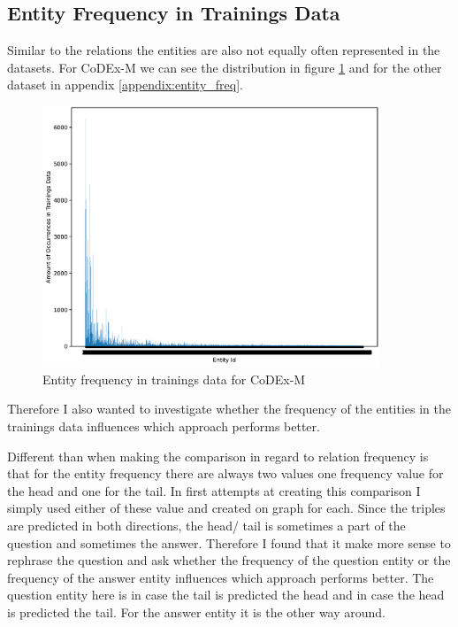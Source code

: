 \subsection{Entity Frequency in Trainings Data}
Similar to the relations the entities are also not equally often represented in the datasets. For CoDEx-M we can see the distribution in figure \ref{fig:entity_freq_codex} and for the other dataset in appendix \ref{appendix:entity_freq}. 

\begin{figure}[H]
\centering
\includegraphics[width=0.9\textwidth]{images/entity_freq_codex.PNG}
\caption{Entity frequency in trainings data for CoDEx-M}
\label{fig:entity_freq_codex}
\end{figure}

Therefore I also wanted to investigate whether the frequency of the entities in the trainings data influences which approach performs better. 

Different than when making the comparison in regard to relation frequency is that for the entity frequency there are always two values one frequency value for the head and one for the tail. In first attempts at creating this comparison I simply used either of these value and created on graph for each. Since the triples are predicted in both directions, the head/ tail is sometimes a part of the question and sometimes the answer. Therefore I found that it make more sense to rephrase the question and ask whether the frequency of the question entity or the frequency of the answer entity influences which approach performs better. The question entity here is in case the tail is predicted the head and in case the head is predicted the tail. For the answer entity it is the other way around.

